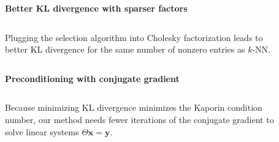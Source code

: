 \documentclass{beamer}                             %
\newcommand{\blocktitle}[1]{{\Large \textbf{#1}}}
\renewcommand{\vec}[1]{\bm{#1}}
\newcommand*{\CM}{\Theta}
\begin{document}
\begin{frame}[t]
\begin{columns}[T]
\begin{column}{0.30\textwidth}
  \begin{tcolorbox}
    \blocktitle{Better KL divergence with sparser factors}

    \begin{columns}
      \hfill
      \begin{column}{0.5\textwidth}
        Plugging the selection algorithm into Cholesky
        factorization leads to better KL divergence for
        the same number of nonzero entries as \( k \)-NN.
      \end{column}
      \begin{column}{0.5\textwidth}
        \begin{figure}[t]
          \centering
          
          \label{fig:chol_rho}
        \end{figure}
      \end{column}
    \end{columns}
  \end{tcolorbox}

  \begin{tcolorbox}
    \blocktitle{Preconditioning with conjugate gradient}

    \begin{columns}
      \hfill
      \begin{column}{0.5\textwidth}
        Because minimizing KL divergence minimizes the Kaporin condition
        number, our method needs fewer iterations of the conjugate
        gradient to solve linear systems \( \CM \vec{x} = \vec{y} \).
      \end{column}
      \begin{column}{0.5\textwidth}
        \begin{figure}[t]
          \centering
          
          \label{fig:cg_iter}
        \end{figure}
      \end{column}
    \end{columns}
  \end{tcolorbox}
\end{column}

\end{columns}


\end{frame}
\end{document}
